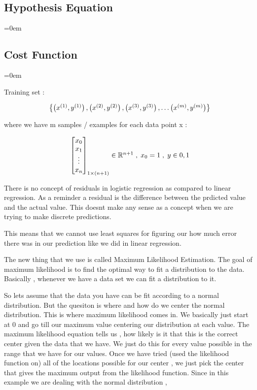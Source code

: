 \subsectionend
\subsection{Hypothesis Equation}
\label{ssec:hypothesis_equation}
\parindent=0em


\subsectionend
\subsection{Cost Function}
\label{ssec:cost_function}
\parindent=0em

Training set :

\[
	\begin{array}{ l@{} l@{} }
	\left\{
		\left( x^{(1)},y^{(1)} \right),
		\left( x^{(2)},y^{(2)} \right),
		\left( x^{(3)},y^{(3)} \right),
		\ldots
		\left( x^{(m)},y^{(m)} \right)
	\right\}
	\end{array}
\]

where we have m samples / examples for each data point x :

\[
	\begin{array}{ l@{} l@{} }
	\begin{bmatrix}
		x_0 \\
		x_1 \\
		\vdots \\
		x_n \\
		\end{bmatrix}
		_{1 \times(n+1)}
	\in \mathbb{R}^{n+1}
	\; , \;
	x_0 = {1}
	\; , \;
	y \in {0,1}
	\end{array}
\]

There is no concept of residuals in logistic regression as compared to linear
regression. As a reminder a residual is the difference between the prdicted
value and the actual value. This doesnt make any sense as a concept when we are
trying to make discrete predictions.


This means that we cannot use least squares for figuring our how much error
there was in our prediction like we did in linear regression.


The new thing that we use is called Maximum Likelihood Estimation. The goal of
maximum likelihood is to find the optimal way to fit a distribution to the
data. Basically , whenever we have a data set we can fit a distribution to it.


So lets assume that the data you have can be fit according to a normal
distribution. But the quesiton is where and how do we center the normal
distribution. This is where maximum likelihood comes in. We basically just
start at 0 and go till our maximum value centering our distribution at each
value. The maximum likelihood equation tells us , how likely is it that this is
the correct center given the data that we have. We just do this for every value
possible in the range that we have for our values. Once we have tried (used the
likelihood function on) all of the locations possible for our center , we just
pick the center that gives the maximum output from the likelihood function.
Since in this example we are dealing with the normal distribution , 



